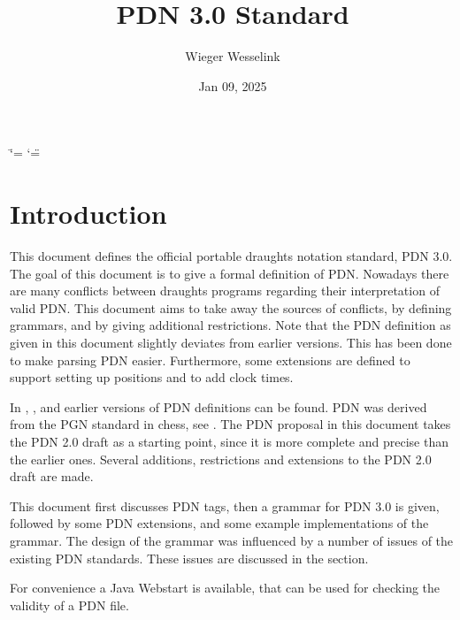 \documentclass[letterpaper,10pt,english]{sphinxmanual}
\title{PDN 3.0 Standard}
\date{Jan 09, 2025}
\author{Wieger Wesselink}
\begin{document}
\ifdefined\shorthandoff
  \ifnum\catcode`\=\string=\active\shorthandoff{=}\fi
  \ifnum\catcode`\"=\active{}\fi
\fi

\pagestyle{empty}
\sphinxmaketitle
\pagestyle{plain}
\sphinxtableofcontents
\pagestyle{normal}
\label{\detokenize{index::doc}}


\sphinxstepscope


\chapter{Introduction}
\label{\detokenize{introduction:introduction}}\label{\detokenize{introduction::doc}}
\sphinxAtStartPar
This document defines the official portable draughts notation standard, PDN 3.0.
The goal of this document is to give a formal definition of PDN.
Nowadays there are many conflicts between draughts programs regarding their
interpretation of valid PDN. This document aims to take away the sources of
conflicts, by defining grammars, and by giving additional restrictions. Note
that the PDN definition as given in this document slightly deviates from earlier
versions. This has been done to make parsing PDN easier. Furthermore, some
extensions are defined to support setting up positions and to add clock times.

\sphinxAtStartPar
In , ,  and  earlier versions
of PDN definitions can be found. PDN was derived from the PGN standard
in chess, see . The PDN proposal in this document takes the PDN 2.0 draft
 as a starting point, since it is more complete and precise than the
earlier ones. Several additions, restrictions and extensions to the PDN 2.0 draft
are made.

\sphinxAtStartPar
This document first discusses PDN tags, then a grammar for PDN 3.0 is given, followed
by some PDN extensions, and some example implementations of the grammar. The
design of the grammar was influenced by a number of issues of the existing
PDN standards. These issues are discussed in the {\hyperref[\detokenize{issues:issues-section}]{}} section.

\sphinxAtStartPar
For convenience a Java Webstart 
is available, that can be used for checking the validity of a PDN file.
\end{document}
